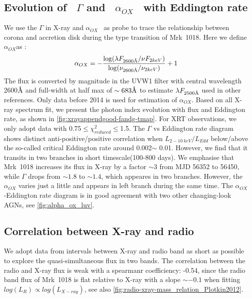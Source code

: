 \documentclass[twocolumn]{aastex63}
\newcommand{\alphaox}{$\alpha_{OX}$}
\newcommand{\angstrom}{\text{\normalfont\AA}}
\begin{document}
\subsection{Evolution of ~\texorpdfstring{$\Gamma$}. and ~\texorpdfstring{$\alpha_{OX}$}.~ with Eddington rate \label{subsec:g-f}}
We use the $\Gamma$ in X-ray and \alphaox ~ as probe to trace the relationship between corona and accretion disk during the type transition of Mrk~1018. Here we define \alphaox as :
\begin{equation}
\alpha_{OX}  = - \frac{\log(\lambda F_{2600 \angstrom}/\nu F_{2keV})}{\log(\nu_{ 2600 \angstrom }/\nu_{2keV})}+1
\end{equation}
The flux is converted by magnitude in the UVW1 filter with central wavelength {2600{$\angstrom$}} and full-width at half max of $\sim 683\angstrom$ \citep{2008MNRAS.383..627P} to estimate $\lambda F_{2500 \angstrom}$ used in other references. Only data before 2014 is used for estimation of $\alpha_{OX}$. Based on all X-ray spectrum fit, we present the photon index evolution with flux and Eddington rate, as shown in \autoref{fig:xrayappendgood-fandg-tmap}. For XRT observations, we only adopt data with 0.75$\le \chi^2_{reduced} \le$1.5. The $\Gamma$ vs Eddington rate diagram shows distinct anti-positive/positive correlation when $L_{2-10~ keV}/L_{Edd}$ below/above the so-called critical Eddington rate around 0.002$\sim$ 0.01. However, we find that it transits in two branches in short timescale(100-800 days). We emphasise that Mrk~1018 increases its flux in X-ray by a factor $\sim3$ from MJD 56352 to 56450, while $\Gamma$ drops from $\sim1.8$ to $\sim1.4$, which appeares in two branches. However, the $\alpha_{OX}$ varies just a little and appears in left branch during the same time. The $\alpha_{OX}$-Eddington rate diagram is in good agreement with two other changing-look AGNs, see \autoref{fig:alpha_ox_luv}. 





\subsection{Correlation between X-ray and radio}\label{subsec:xray-radio}
We adopt data from intervals between X-ray and radio band as short as possible to explore the quasi-simultaneous flux in two bands. The correlation between the radio and X-ray flux is weak with a spearmanr coefficiency: -0.54, since the radio band flux of Mrk~1018 is flat relative to X-ray with a slope $\sim -0.1$ when fitting $log(L_{R})\propto log(L_{X-ray})$, see also \autoref{fig:radio-xray-mass_relation_Plotkin2012}. 
\end{document}
